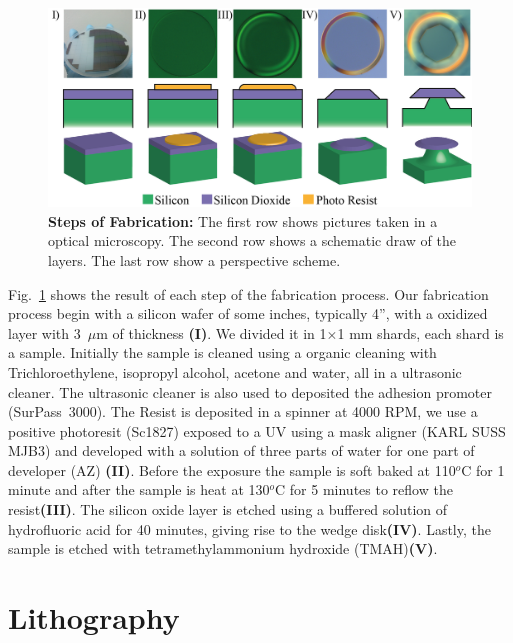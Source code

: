 \begin{figure}[!t]
    \centering
    \includegraphics[width = 16cm]{figuras/Dissertation_fabrication_steps.jpg}
    \caption{\textbf{Steps of Fabrication:} The first row shows pictures taken in a optical microscopy. The second row shows a schematic draw of the layers. The last row show a perspective scheme.}
    \label{fig:fab_step}
\end{figure}

Fig.~\ref{fig:fab_step} shows the result of each step of the fabrication process. Our fabrication process begin with a silicon wafer of some inches, typically 4'', with a oxidized layer with 3~$\mu$m of thickness \textbf{(I)}. We divided it in 1$\times$1 mm shards, each shard is a sample. Initially the sample is cleaned using a organic cleaning with Trichloroethylene, isopropyl alcohol, acetone and water, all in a ultrasonic cleaner. The ultrasonic cleaner is also used to deposited the adhesion promoter (SurPass\regmark~3000). The Resist is deposited in a spinner at 4000 RPM, we use a positive photoresit (Sc1827) exposed to a UV using a mask aligner (KARL SUSS MJB3) and developed with a solution of three parts of water for one part of developer (AZ) \textbf{(II)}. Before the exposure the sample is soft baked at 110$^o$C for 1 minute and after the sample is heat at 130$^o$C for 5 minutes to reflow the resist\textbf{(III)}. The silicon oxide layer is etched using a buffered solution of hydrofluoric acid for 40 minutes, giving rise to the wedge disk\textbf{(IV)}. Lastly, the sample is etched with tetramethylammonium hydroxide (TMAH)\textbf{(V)}. 

\section{Lithography}

